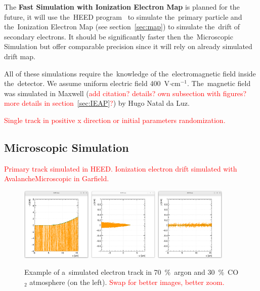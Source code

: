\documentclass[]{article}
\begin{document}
		The \textbf{Fast Simulation with Ionization Electron Map} is planned for the future, it will use the~HEED program~\cite{HEED} to simulate the~primary particle and the~Ionization Electron Map (see section~\ref{sec:map}) to simulate the~drift of secondary electrons. It should be significantly faster then the~Microscopic Simulation but offer comparable precision since it will rely on already simulated drift map.
		
		All of these simulations require the~knowledge of the~electromagnetic field inside the~detector. We assume uniform electric field 400~V$\cdot$cm$^{-1}$. The~magnetic field was simulated in Maxwell (\textcolor{red}{add citation? details? own subsection with figures? more details in section~\ref{sec:IEAP}?}) by Hugo Natal da Luz.
	
		\textcolor{red}{Single track in positive x direction or initial parameters randomization.}
	
		\subsection{Microscopic Simulation}
			\textcolor{red}{Primary track simulated in HEED. Ionization electron drift simulated with AvalancheMicroscopic in Garfield.}
			
			\begin{figure}
				\centering
				\includegraphics[width=0.3\textwidth]{7030_xz.png}
				\includegraphics[width=0.3\textwidth]{7030_yz.png}
				\includegraphics[width=0.3\textwidth]{7030_xy.png}
				\caption{Example of a~simulated electron track in 70~\%~argon and 30~\%~CO$_2$ atmosphere (on the left). \textcolor{red}{Swap for better images, better zoom.}}
				\label{fig:7030sim}
			\end{figure}
			
\end{document}
